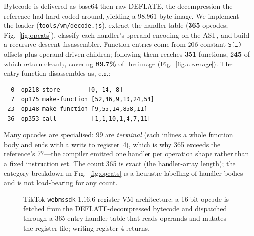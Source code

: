 \documentclass[conference,10pt]{IEEEtran}
\newcommand{\code}[1]{\texttt{\small #1}}
\begin{document}
Bytecode is delivered as base64 then raw DEFLATE, the decompression the reference had hard-coded around, yielding a 98{,}961-byte image. We implement the loader (\code{tools/vm/decode.js}), extract the handler table (\textbf{365} opcodes; Fig.~\ref{fig:opcats}), classify each handler's operand encoding on the AST, and build a recursive-descent disassembler. Function entries come from 206 constant \code{S(\ldots)} offsets plus operand-driven children; following them reaches \textbf{351} functions, \textbf{245} of which return cleanly, covering \textbf{89.7\%} of the image (Fig.~\ref{fig:coverage}). The entry function disassembles as, e.g.:
\begin{lstlisting}
  0  op218 store        [0, 14, 8]
  7  op175 make-function [52,46,9,10,24,54]
 23  op148 make-function [9,56,14,868,11]
 36  op353 call          [1,1,10,1,4,7,11]
\end{lstlisting}
Many opcodes are specialised: 99 are \emph{terminal} (each inlines a whole function body and ends with a write to register~4), which is why 365 exceeds the reference's 77---the compiler emitted one handler per operation shape rather than a fixed instruction set. The count 365 is exact (the handler-array length); the category breakdown in Fig.~\ref{fig:opcats} is a heuristic labelling of handler bodies and is not load-bearing for any count.

\begin{figure}[t]
  \centering
  \caption{TikTok \code{webmssdk} 1.16.6 register-VM architecture: a 16-bit opcode is fetched from the DEFLATE-decompressed bytecode and dispatched through a 365-entry handler table that reads operands and mutates the register file; writing register 4 returns.}
  \label{fig:arch}
\end{figure}
\end{document}
